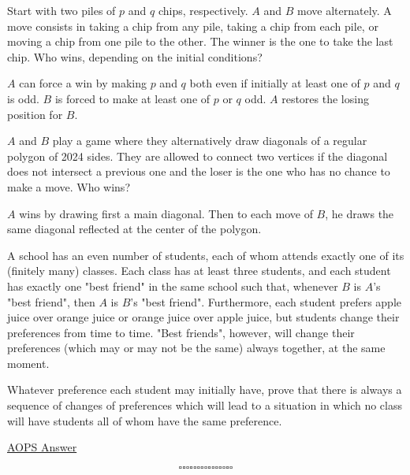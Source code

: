 \documentclass[12pt]{exam}
\begin{document}
\begin{questions}
\question Start with two piles of $p$ and $q$ chips, respectively. $A$ and $B$ move alternately. A move consists in taking a chip from any pile, taking a chip from each pile, or moving a chip from one pile to the other. The winner is the one to take the last chip. Who wins, depending on the initial conditions?
\begin{solution}
$A$ can force a win by making $p$ and $q$ both even if initially at least one of $p$ and $q$ is
odd. $B$ is forced to make at least one of $p$ or $q$ odd. $A$ restores the losing position
for $B$.
\end{solution}

\question $A$ and $B$ play a game where they alternatively draw diagonals of a regular polygon of 2024 sides. They are allowed to connect two vertices if the diagonal does not intersect a previous one and the loser is the one who has no chance to make a move. Who wins?
\begin{solution}
$A$ wins by drawing first a main diagonal. Then to each move of $B$, he draws the same
diagonal reflected at the center of the polygon.
\end{solution}

\question A school has an even number of students, each of whom attends exactly one of its (finitely many) classes. Each class has at least three students, and each student has exactly one "best friend" in the same school such that, whenever $\displaystyle B$ is $\displaystyle A$'s "best friend", then $\displaystyle A$ is $\displaystyle B$'s "best friend". Furthermore, each student prefers apple juice over orange juice or orange juice over apple juice, but students change their preferences from time to time. "Best friends", however, will change their preferences (which may or may not be the same) always together, at the same moment.

Whatever preference each student may initially have, prove that there is always a sequence of changes of preferences which will lead to a situation in which no class will have students all of whom have the same preference.

\begin{solution}
\href{https://artofproblemsolving.com/wiki/index.php/2005_IMO_Shortlist_Problems/C1}{AOPS Answer}
\end{solution}
\end{questions}

$$\square \square \square \square \square \square \square \square \square \square \square \square \square \square \square $$
\end{document}
